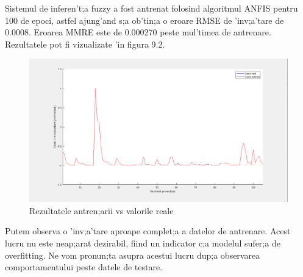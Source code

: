 \par
Sistemul de inferen't;a fuzzy a fost antrenat folosind algoritmul ANFIS pentru 100 de epoci, astfel ajung'and s;a ob'tin;a o eroare RMSE de 'inv;a'tare de 0.0008. Eroarea MMRE este de 0.000270 peste mul'timea de antrenare. Rezultatele pot fi vizualizate 'in figura 9.2.
\newpage
\begin{figure}[!htbp]
\includegraphics[width=\textwidth]{training_estimated}
\caption{Rezultatele antren;arii vs valorile reale}
\end{figure}
\par
Putem observa o 'inv;a'tare aproape complet;a a datelor de antrenare. Acest lucru nu este neap;arat dezirabil, fiind un indicator c;a modelul sufer;a de overfitting. Ne vom pronun;ta asupra acestui lucru dup;a observarea comportamentului peste datele de testare.
